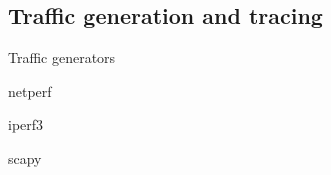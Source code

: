\subsection{Traffic generation and tracing}

\begin{frame}{Traffic generators}
\end{frame}

\begin{frame}{netperf}
\end{frame}

\begin{frame}{iperf3}
\end{frame}

\begin{frame}{scapy}
\end{frame}


